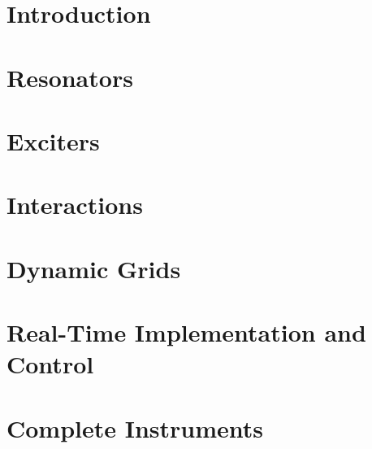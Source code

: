 % 


\frontmatter
\pagestyle{empty} %




\cleardoublepage
{}
\pagestyle{fancy} %
\tableofcontents
\listoftodos

\cleardoublepage

\mainmatter
\part{Introduction}\label{part:introduction}


\part{Resonators}\label{part:resonators}


\part{Exciters}\label{part:exciters}


\part{Interactions}\label{part:interactions}


\part{Dynamic Grids}\label{part:dynamic}


\part{Real-Time Implementation and Control}\label{part:realtime}


\part{Complete Instruments}\label{part:instrument}


